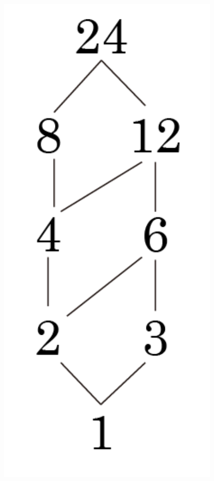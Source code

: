 \documentclass[UTF8]{ctexart}
\begin{document}
    \begin{figure}[!htb]
        \centering
        \begin{minipage}[t]{0.153\textwidth}
        \centering
        \includegraphics[width=1\textwidth]{10-39-1.png}

\end{minipage}
\end{figure}
\end{document}
